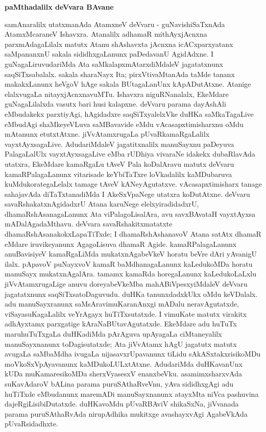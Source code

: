 \smallskip
\begin{center}
{\Large\bf paMthadalilx deVvara BAvane}
\end{center}

samAnaralilx utatxmanAda AtamxneV deVvaru - guNavishiSaTxnAda AtamxMcaraneV Ishavxra. Atanalilx adhamaR mithAyxjAcnxna parxmAdagaLilalx matutx Atanu shAshavxta jAcnxna icACxparxyatanx saMpananxnU sakala sididhxgaLanunx paDedavanU AgidAdxne. I guNagaLiruvudariMda Ata saMkalapxmAtarxdiMdaleV jagatatxnunx saqSiTxsabalalx. sakala sharaNayx Ita; pirxVtivaMtanAda taMde tananx makakxLanunx heVgoV hAge sakala BUtagaLanUnx kApADutAtxne. Atanige elalxvugaLa nitayxjAcnxnavuMTu. Ishavxra niguRNanalalx, EkeMdare guNagaLilalxda vasutx bari husi kalapxne. deVvaru parama dayAshAli eMbudakekx parxtiyAgi, hAgidadxre saqSiTxyalelxVke duHKa saMkaTagaLive eMbudAgi shaMkeyeVLuva saMBavavide eMdu vAcasapxtimisharxnu oMdu mAtanunx etutxtAtxne. jiVvAtamxrugaLa pUvaRkamaRgaLalilx vayxtAyxsagaLive. AdudariMdaleV jagatitxnalilx manuSayxnu paDeyuva PalagaLalUlx vayxtAyxsagaLive eMba rUDhiya vivaraNe idakekx dubaRlavAda utatxra, EkeMdare kamaRgaLu tAveV Pala koDalAravu matutx deVvaru kamaRPalagaLanunx vitarisade keYbiTaTxre loVkadalilx kaMDubaruva kuMdukorategaLelalx tamage tAveV kANeyAgutatxve. vAcasapxtimisharx tanage sahajavAda diTaTxtanadiMda I AkeSxVpaNege utatxra koDutAtxne. deVvaru savaRshakatxnAgidadxrU Atana karuNege elelxyiradidadxrU, dhamaRshAsanagaLanunx Ata viPalagoLisalAra, avu savxBAvataH vayxtAyxsa mADalAgadaMthavu. deVvara savaRshakitxmatatxte dhamaRshAsanakokxLapaTiTxde; I dhamaRshAshanavoV Atana satAtx dhamaR eMdare iruvikeyanunx AgagoLisuva dhamaR Agide. kamaRPalagaLanunx anuBavisiyeV kamaRgaLiMda mukatxnAgabeVkeV horatu beVre dAri yAvanigU ilalx. pApavoV puNayxvoV kamaR baMdhanagaLanunx kaLedukoMDa horatu manuSayx mukatxnAgalAra. tamamx kamaRda horegaLanunx kaLedukoLaLxlu jiVvAtamxrugaLige anuvu doreyabeVkeMba mahABiVpesxyiMdaleV deVvaru jagatatxnunx saqSiTxsatoDaguvudu. duHKa tanunxdadxkUkx oMdu keVDalalx. adu manuSayxranunx saMsAravimuKaranAnxgi mADalu neravAgutatxde, viSayasuKagaLalilx veYrAgayx huTiTxsutatxde. I vimuKate matutx virakitx adhAyxtamx parxgatige kAraNaBUtavAgutatxde. EkeMdare adu huTuTx maruhuTuTxgaLa duHKadiMda pArAguva upAyagaLa ciMtaneyalilx manuSayxnanunx toDagisutatxde; Ata jiVvAtamx hAgU jagatutx matutx avugaLa saMbaMdha ivugaLa nijasavxrUpavanunx tiLidu sAkASxtakxrisikoMDu moVkoSxVpAyavanunx kaMDukoLULxtAtxne. AdudariMda duHKavanUnx kUDa muKamaresikoMDa sherxVyasesxV enanxbeVku. asamimxsharxvAda suKavAdaroV bALina parama puruSAthaRveVnu, yAva sididhxgAgi adu huTiTxde eMbudanunx maremADi manuSayxnanunx atayxMta niVca pashuvina dajeRgiLisibiDutatxde. duHKavoMdu pUvaRBAviV shikaSxNa, jiVvanada parama puruSAthaRvAda nirupAdhika mukitxge avashayxvAgi AgabeVkAda pUvaRsidadhxte.

